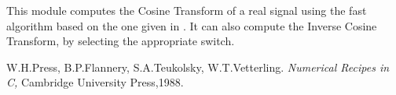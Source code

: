 This module computes the Cosine Transform of a real signal using the 
fast algorithm based on the one given in \cite{Press}.
It can also compute the Inverse Cosine Transform, by selecting the appropriate
switch.

\begin{thebibliography}{Dau1}

 W.H.Press, B.P.Flannery, S.A.Teukolsky, W.T.Vetterling.
{\em Numerical Recipes in C,} 
Cambridge University Press,1988. 

\end{thebibliography}